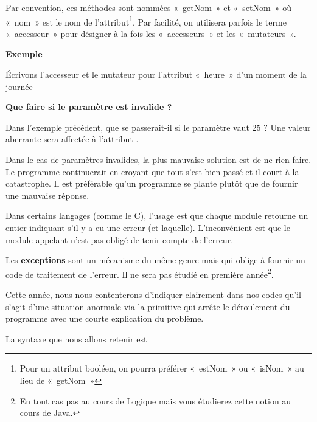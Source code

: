 Par convention, ces méthodes sont nommées «~getNom~» et «~setNom~» où
«~nom~» est le nom de
l'attribut\footnote{{Pour un
attribut booléen, on pourra préférer «~estNom~» ou «~isNom~» au lieu de
«~getNom~»}}. Par facilité, on utilisera parfois le terme «~accesseur~»
pour désigner à la fois les «~accesseurs~» et les «~mutateurs~».

{\bfseries
Exemple}

Écrivons l'accesseur et le mutateur pour
l'attribut «~heure~» d'un moment de
la journée


\bigskip


\bigskip

{\sffamily\bfseries\upshape
Que faire si le paramètre est invalide ? }

Dans l'exemple précédent, que se passerait-il si le
paramètre  vaut 25 ? Une valeur aberrante sera
affectée à l'attribut .

Dans le cas de paramètres invalides, la plus mauvaise solution est de ne
rien faire. Le programme continuerait en croyant que tout s’est bien
passé et il court à la catastrophe. Il est préférable qu’un programme
se plante plutôt que de fournir une mauvaise réponse. 

Dans certains langages (comme le C), l’usage est que chaque module
retourne un entier indiquant s'il y a eu une erreur
(et laquelle). L’inconvénient est que le module appelant n’est pas
obligé de tenir compte de l’erreur.

Les \textbf{exceptions} sont un mécanisme du même genre mais qui oblige
à fournir un code de traitement de l’erreur. Il ne sera pas étudié en
première année\footnote{{En tout cas pas au
cours de Logique mais vous étudierez cette notion au cours de Java.}}.

Cette année, nous nous contenterons d'indiquer
clairement dans nos codes qu'il
s'agit d'une situation anormale via
la primitive  qui arrête le déroulement du
programme avec une courte explication du problème.

La syntaxe que nous allons retenir est

